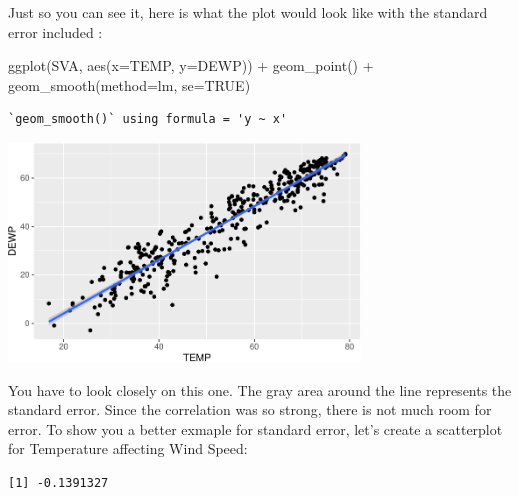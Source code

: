 \documentclass[
  letterpaper,
  DIV=11,
  numbers=noendperiod]{scrreprt}
\newenvironment{Shaded}{\begin{snugshade}}{\end{snugshade}}
\newcommand{\AttributeTok}[1]{\textcolor[rgb]{0.40,0.45,0.13}{#1}}
\newcommand{\ConstantTok}[1]{\textcolor[rgb]{0.56,0.35,0.01}{#1}}
\newcommand{\FunctionTok}[1]{\textcolor[rgb]{0.28,0.35,0.67}{#1}}
\newcommand{\NormalTok}[1]{\textcolor[rgb]{0.00,0.23,0.31}{#1}}
\newcommand{\SpecialCharTok}[1]{\textcolor[rgb]{0.37,0.37,0.37}{#1}}
\newcommand{\StringTok}[1]{\textcolor[rgb]{0.13,0.47,0.30}{#1}}
\begin{document}
Just so you can see it, here is what the plot would look like with the
standard error included :

\begin{Shaded}
\begin{Highlighting}[]
\FunctionTok{ggplot}\NormalTok{(SVA, }\FunctionTok{aes}\NormalTok{(}\AttributeTok{x=}\NormalTok{TEMP, }\AttributeTok{y=}\NormalTok{DEWP)) }\SpecialCharTok{+}
  \FunctionTok{geom\_point}\NormalTok{() }\SpecialCharTok{+}
  \FunctionTok{geom\_smooth}\NormalTok{(}\AttributeTok{method=}\StringTok{\textquotesingle{}lm\textquotesingle{}}\NormalTok{, }\AttributeTok{se=}\ConstantTok{TRUE}\NormalTok{)}
\end{Highlighting}
\end{Shaded}

\begin{verbatim}
`geom_smooth()` using formula = 'y ~ x'
\end{verbatim}

\begin{center}
\includegraphics[width=0.7\textwidth,height=\textheight]{Linear_Modeling_and_Regression_files/figure-pdf/unnamed-chunk-13-1.pdf}
\end{center}

You have to look closely on this one. The gray area around the line
represents the standard error. Since the correlation was so strong,
there is not much room for error. To show you a better exmaple for
standard error, let's create a scatterplot for Temperature affecting
Wind Speed:

\begin{Shaded}
\end{Shaded}

\begin{verbatim}
[1] -0.1391327
\end{verbatim}
\end{document}
